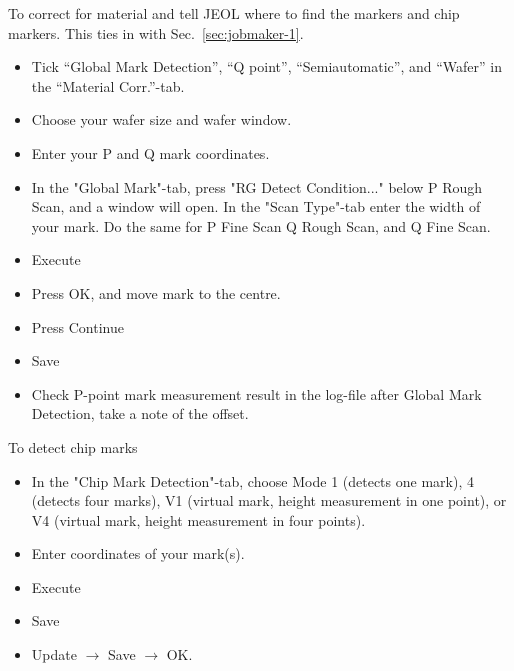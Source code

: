 To correct for material and tell JEOL where to find the markers and chip markers. This ties in with Sec.~\ref{sec:jobmaker-1}.
\begin{itemize}
\item Tick ``Global Mark Detection'', ``Q  point'', ``Semiautomatic'', and ``Wafer'' in the ``Material
  Corr.''-tab.
\item Choose your wafer size and wafer window. %
\item Enter your P and Q mark coordinates.
\item In  the "Global Mark"-tab,  press "RG  Detect Condition..." below  P Rough Scan,  and a
  window will open.  In the "Scan Type"-tab enter the  width of your mark. Do the  same for P
  Fine Scan Q Rough Scan, and Q Fine Scan.
\item Execute
\item Press OK, and move mark to the centre.
\item Press Continue
\item Save
\item Check P-point mark measurement result in the log-file after Global Mark Detection, take
  a note of the offset.
\end{itemize}
To detect chip marks
\begin{itemize}
\item In  the "Chip  Mark Detection"-tab, choose  Mode 1
  (detects  one  mark),  4   (detects  four  marks),  V1
  (virtual mark, height measurement in one point), or V4
  (virtual mark, height measurement in four points).
\item Enter coordinates of your mark(s).
\item Execute
\item Save
\item Update $\rightarrow$ Save $\rightarrow$ OK.
\end{itemize}


